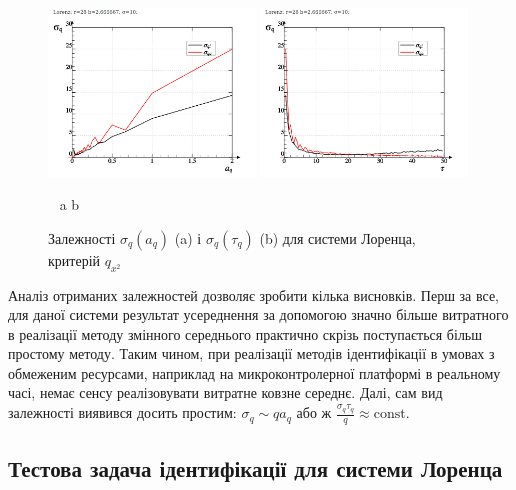 \begin{figure}[ht!]
\begin{center}
  \includegraphics[width=0.49\textwidth]{p/cha/lor/lor_qx2_tau-p_aq_sd.png}
  \hfill
  \includegraphics[width=0.49\textwidth]{p/cha/lor/lor_qx2_tau-p_tau_sd.png}
\end{center}
  \vspace{-1.0ex}
  \begin{center}
    ~ \hfill a \hfill\hfill b \hfill ~
  \end{center}
  \vspace{-1.5ex}
  \caption{Залежності $ \sigma_{q} (a_q) $ (a) і $ \sigma_{q} (\tau_q) $ (b) для системи Лоренца, критерій $q_{x^2}$}
\label{atu:f:lor_qx2_tau}
\end{figure}

Аналіз отриманих залежностей дозволяє зробити кілька
висновків. Перш за все, для даної системи результат усереднення
за допомогою значно більше витратного в реалізації
методу змінного середнього практично скрізь поступається
більш простому методу. Таким чином, при реалізації методів
ідентифікації в умовах з обмеженим ресурсами, наприклад на
микроконтролерної платформі в реальному часі, немає сенсу
реалізовувати витратне ковзне середнє. Далі, сам вид
залежності виявився досить простим:
$ \sigma_q \sim q a_q $ або ж
$ \frac{\sigma_q \tau_q}{q} \approx \mathrm{const}$.



\subsection{Тестова задача ідентифікації для системи Лоренца}%

